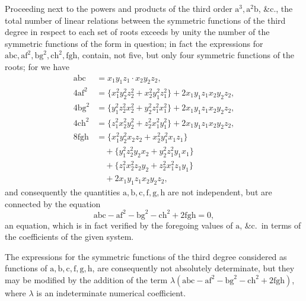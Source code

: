 \documentclass[11pt]{article}
\begin{document}
\noindent Proceeding next to the powers and products of the third order $\mathrm{a}^3, \mathrm{a}^2\mathrm{b}$, \&c., the total number of linear relations between the symmetric functions of the third degree in respect to each set of roots exceeds by unity the number of the symmetric functions of the form in question; in fact the expressions for $\mathrm{abc}, \mathrm{af}^2, \mathrm{bg}^2, \mathrm{ch}^2, \mathrm{fgh}$, contain, not five, but only four symmetric functions of the roots; for we have
\[
\begin{aligned}
\mathrm{abc} &= x_1 y_1 z_1 \cdot x_2 y_2 z_2,\\
4\mathrm{af}^2 &= \{x_1^2 y_2^2 z_2^2 + x_2^2 y_1^2 z_1^2\} + 2 x_1 y_1 z_1 x_2 y_2 z_2,\\
4\mathrm{bg}^2 &= \{y_1^2 z_2^2 x_2^2 + y_2^2 z_1^2 x_1^2\} + 2 x_1 y_1 z_1 x_2 y_2 z_2,\\
4\mathrm{ch}^2 &= \{z_1^2 x_2^2 y_2^2 + z_2^2 x_1^2 y_1^2\} + 2 x_1 y_1 z_1 x_2 y_2 z_2,\\
8\mathrm{fgh} &= \{x_1^2 y_2^2 x_2 z_2 + x_2^2 y_1^2 x_1 z_1\}\\
&\quad + \{y_1^2 z_2^2 y_2 x_2 + y_2^2 z_1^2 y_1 x_1\}\\
&\quad + \{z_1^2 x_2^2 z_2 y_2 + z_2^2 x_1^2 z_1 y_1\}\\
&\quad + 2 x_1 y_1 z_1 x_2 y_2 z_2,
\end{aligned}
\]
and consequently the quantities $\mathrm{a}, \mathrm{b}, \mathrm{c}, \mathrm{f}, \mathrm{g}, \mathrm{h}$ are not independent, but are connected by the equation
\[
\mathrm{abc} - \mathrm{af}^2 - \mathrm{bg}^2 - \mathrm{ch}^2 + 2\mathrm{fgh} = 0,
\]
an equation, which is in fact verified by the foregoing values of $\mathrm{a}$, \&c.\ in terms of the coefficients of the given system.

\medskip

\noindent The expressions for the symmetric functions of the third degree considered as functions of $\mathrm{a}, \mathrm{b}, \mathrm{c}, \mathrm{f}, \mathrm{g}, \mathrm{h}$, are consequently not absolutely determinate, but they may be modified by the addition of the term $\lambda (\mathrm{abc} - \mathrm{af}^2 - \mathrm{bg}^2 - \mathrm{ch}^2 + 2\mathrm{fgh})$, where $\lambda$ is an indeterminate numerical coefficient.

\medskip
\end{document}
